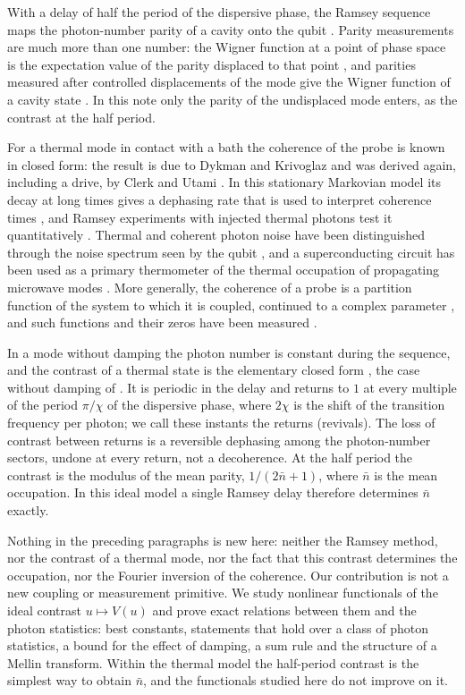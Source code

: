 \documentclass[11pt,reqno]{amsart}
\makeatletter
\let\CG@origeqref\eqref
\newcommand{\CG@gettip}[1]{\@ifundefined{CGTip@#1}{Reference: #1}{\csname CGTip@#1\endcsname}}
\DeclareRobustCommand{\CGeqref}[1]{\pdftooltip{\CG@origeqref{#1}}{\CG@gettip{#1}}}
\let\CG@origcite\cite
\renewcommand*{\cite}[2][]{\def\CG@citekey{#2}%
  \ifx\relax#1\relax\CG@origcite{#2}\else\CG@origcite[#1]{#2}\fi}
\numberwithin{equation}{section}
\theoremstyle{plain}
\theoremstyle{definition}
\theoremstyle{remark}
\makeatother
\begin{document}
With a delay of half the period of the dispersive phase, the Ramsey sequence maps the photon-number parity of a cavity onto the qubit \cite{Sun2014}. Parity measurements are much more than one number: the Wigner function at a point of phase space is the expectation value of the parity displaced to that point \cite{Royer1977}, and parities measured after controlled displacements of the mode give the Wigner function of a cavity state \cite{Vlastakis2013}. In this note only the parity of the undisplaced mode enters, as the contrast at the half period.

For a thermal mode in contact with a bath the coherence of the probe is known in closed form: the result is due to Dykman and Krivoglaz \cite{DykmanKrivoglaz1987} and was derived again, including a drive, by Clerk and Utami \cite{ClerkUtami2007}. In this stationary Markovian model its decay at long times gives a dephasing rate that is used to interpret coherence times \cite{Rigetti2012}, and Ramsey experiments with injected thermal photons test it quantitatively \cite{Sears2012}. Thermal and coherent photon noise have been distinguished through the noise spectrum seen by the qubit \cite{Yan2018}, and a superconducting circuit has been used as a primary thermometer of the thermal occupation of propagating microwave modes \cite{Scigliuzzo2020}. More generally, the coherence of a probe is a partition function of the system to which it is coupled, continued to a complex parameter \cite{WeiLiu2012}, and such functions and their zeros have been measured \cite{Peng2015}.

In a mode without damping the photon number is constant during the sequence, and the contrast of a thermal state is the elementary closed form \CGeqref{eq:V}, the case without damping of \cite{DykmanKrivoglaz1987,ClerkUtami2007}. It is periodic in the delay and returns to $1$ at every multiple of the period $\pi/\chi$ of the dispersive phase, where $2\chi$ is the shift of the transition frequency per photon; we call these instants the returns (revivals). The loss of contrast between returns is a reversible dephasing among the photon-number sectors, undone at every return, not a decoherence. At the half period the contrast is the modulus of the mean parity, $1/(2\bar n+1)$, where $\bar n$ is the mean occupation. In this ideal model a single Ramsey delay therefore determines $\bar n$ exactly.

Nothing in the preceding paragraphs is new here: neither the Ramsey method, nor the contrast of a thermal mode, nor the fact that this contrast determines the occupation, nor the Fourier inversion of the coherence. Our contribution is not a new coupling or measurement primitive. We study nonlinear functionals of the ideal contrast $u\mapsto V(u)$ and prove exact relations between them and the photon statistics: best constants, statements that hold over a class of photon statistics, a bound for the effect of damping, a sum rule and the structure of a Mellin transform. Within the thermal model the half-period contrast is the simplest way to obtain $\bar n$, and the functionals studied here do not improve on it.
\end{document}
